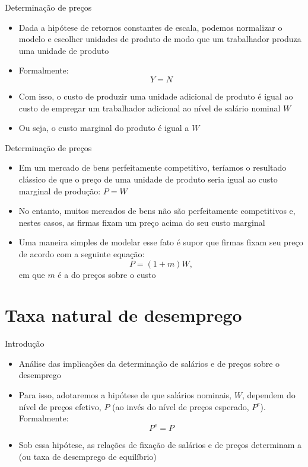 \documentclass[10pt]{beamer}
\begin{document}
\begin{frame}
    {Determinação de preços}
    \begin{itemize}
        \item Dada a hipótese de retornos constantes de escala, podemos normalizar o modelo e escolher unidades de produto de modo que um trabalhador produza uma unidade de produto\bigskip
        \item Formalmente:
        \begin{equation}
            Y = N
        \end{equation}
        \item Com isso, o custo de produzir uma unidade adicional de produto é igual ao custo de empregar um trabalhador adicional ao nível de salário nominal $W$\bigskip
        \item Ou seja, o custo marginal do produto é igual a $W$
    \end{itemize}
\end{frame}

\begin{frame}
    {Determinação de preços}
    \begin{itemize}
        \item Em um mercado de bens perfeitamente competitivo, teríamos o resultado clássico de que o preço de uma unidade de produto seria igual ao custo marginal de produção: $P = W$\bigskip
        \item No entanto, muitos mercados de bens não são perfeitamente competitivos e, nestes casos, as firmas fixam um preço acima do seu custo marginal\bigskip
        \item Uma maneira simples de modelar esse fato é supor que firmas fixam seu preço de acordo com a seguinte equação:
        \begin{equation}
            P = (1 + m)W,
        \end{equation}
        em que $m$ é a  do preços sobre o custo
    \end{itemize}
\end{frame}

\section{Taxa natural de desemprego}
\begin{frame}
    {Introdução}
    \begin{itemize}
        \item Análise das implicações da determinação de salários e de preços sobre o desemprego\bigskip
        \item Para isso, adotaremos a hipótese de que salários nominais, $W$, dependem do nível de preços efetivo, $P$ (ao invés do nível de preços esperado, $P^e$). Formalmente:
        \begin{equation}
            P^e = P
        \end{equation}
        \item Sob essa hipótese, as relações de fixação de salários e de preços determinam a  (ou taxa de desemprego de equilíbrio)
    \end{itemize}
\end{frame}
\end{document}
